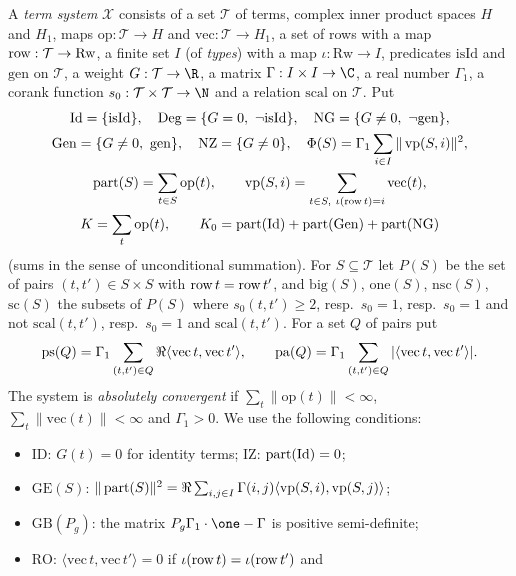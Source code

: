 \begin{definition}\label{pf:thmS:terms}
A \emph{term system} $\mathcal X$ consists of a set $\mathcal T$ of terms, complex inner product spaces $H$ and $H_1$,
maps $\mathrm{op}:\mathcal T\to H$ and $\mathrm{vec}:\mathcal T\to H_1$, a set of rows with a map
$\operatorname{row}:\mathcal T\to\mathrm{Rw}$, a finite set $I$ (of \emph{types}) with a map $\iota:\mathrm{Rw}\to I$,
predicates $\mathrm{isId}$ and $\mathrm{gen}$ on $\mathcal T$, a weight $G:\mathcal T\to\R$, a matrix $\Gamma:I\times
I\to\C$, a real number $\Gamma_1$, a corank function $s_0:\mathcal T\times\mathcal T\to\N$ and a relation
$\mathrm{scal}$ on $\mathcal T$. Put
\begin{gather*}
\thmSId=\{\mathrm{isId}\},\quad \thmSDeg=\{G=0,\ \neg\mathrm{isId}\},\quad \thmSNG=\{G\ne0,\ \neg\mathrm{gen}\},\\
\thmSGen=\{G\ne0,\ \mathrm{gen}\},\quad \thmSNZ=\{G\ne0\},\quad \Phi(S)=\Gamma_1\sum_{i\in I}\|\thmSvp(S,i)\|^2,\\
\thmSpart(S)=\sum_{t\in S}\mathrm{op}(t),\qquad \thmSvp(S,i)=\sum_{t\in S,\ \iota(\thmSrow t)=i}\mathrm{vec}(t),\\
K=\sum_t\mathrm{op}(t),\qquad K_0=\thmSpart(\thmSId)+\thmSpart(\thmSGen)+\thmSpart(\thmSNG)
\end{gather*}
(sums in the sense of unconditional summation). For $S\subseteq\mathcal T$ let $P(S)$ be the set of pairs
$(t,t')\in S\times S$ with $\operatorname{row} t=\operatorname{row} t'$, and $\mathrm{big}(S)$, $\mathrm{one}(S)$, $\mathrm{nsc}(S)$,
$\mathrm{sc}(S)$ the subsets of $P(S)$ where $s_0(t,t')\ge2$, resp.\ $s_0=1$, resp.\ $s_0=1$ and not
$\mathrm{scal}(t,t')$, resp.\ $s_0=1$ and $\mathrm{scal}(t,t')$. For a set $Q$ of pairs put
\[
\operatorname{ps}(Q)=\Gamma_1\sum_{(t,t')\in Q}\Re\langle\mathrm{vec}\,t,\mathrm{vec}\,t'\rangle,\qquad
\operatorname{pa}(Q)=\Gamma_1\sum_{(t,t')\in Q}|\langle\mathrm{vec}\,t,\mathrm{vec}\,t'\rangle|.
\]
The system is \emph{absolutely convergent} if $\sum_t\|\mathrm{op}(t)\|<\infty$, $\sum_t\|\mathrm{vec}(t)\|<\infty$ and
$\Gamma_1>0$. We use the following conditions:
\begin{itemize}
\item $\mathrm{ID}$: $G(t)=0$ for identity terms; $\mathrm{IZ}$: $\operatorname{part}(\mathrm{Id})=0$;
\item $\mathrm{GE}(S)$: $\|\operatorname{part}(S)\|^2=\Re\sum_{i,j\in I}\Gamma(i,j)\langle\operatorname{vp}(S,i),\operatorname{vp}(S,j)\rangle$;
\item $\mathrm{GB}(P_g)$: the matrix $P_g\Gamma_1\cdot\one-\Gamma$ is positive semi-definite;
\item $\mathrm{RO}$: $\langle\mathrm{vec}\,t,\mathrm{vec}\,t'\rangle=0$ if $\iota(\operatorname{row} t)=\iota(\operatorname{row} t')$ and

\end{itemize}
\end{definition}
